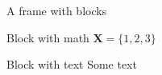 \documentclass[12pt, t]{beamer}
\begin{document}
\begin{frame}[c]{A frame with blocks}
	\begin{block}{Block with math}
		$\mathbf{X} = \{1, 2, 3\}$
	\end{block}
	\begin{block}{Block with text}
		Some text
	\end{block}
\end{frame}
\end{document}
